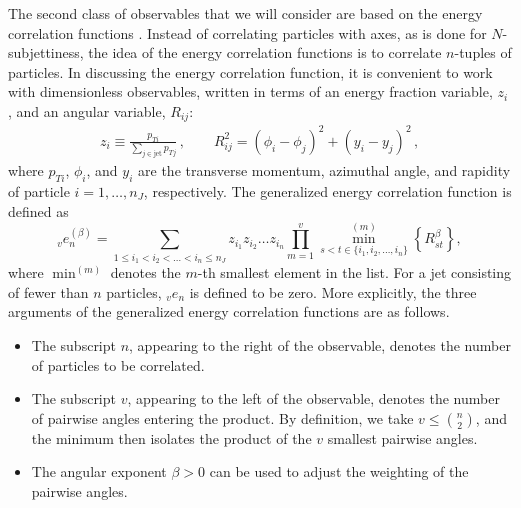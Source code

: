\documentclass[11pt,letterpaper]{article}
\DeclareRobustCommand{\Ref}[1]{Ref.~\cite{#1}}
\newcommand{\ecfvar}[3]{{_{#1}e_{#2}^{(#3)}}}
\newcommand{\ecfvarnobeta}[2]{{_{#1}e_{#2}}}
\begin{document}
The second class of observables that we will consider are based on the energy correlation functions \cite{Larkoski:2013eya,Moult:2016cvt}.
%
Instead of correlating particles with axes, as is done for $N$-subjettiness, the idea of the energy correlation functions is to correlate $n$-tuples of particles.
%
In discussing the energy correlation function, it is convenient to work with dimensionless observables, written in terms of an energy fraction variable, $z_i$, and an angular variable, $R_{ij}$:
\begin{align}\label{eq:ptratio}  
z_i\equiv\frac{p_{Ti}}{\sum_{j \in \text{jet}} p_{Tj}}\,, \qquad   R_{ij}^2 = (\phi_i-\phi_j)^2+(y_i-y_j)^2\,,
\end{align}
where $p_{Ti}$, $\phi_i$, and $y_i$ are the transverse momentum,
azimuthal angle, and rapidity of particle $i=1,\dots,n_J$, respectively. 
%
%
The generalized energy correlation function is defined as
\begin{equation}\label{eq:ecf_gen}
\ecfvar{v}{n}{\beta} = \sum_{1 \leq i_1 < i_2 < \dots < i_n \leq n_J} z_{i_1} z_{i_2} \dots z_{i_n} \prod_{m = 1}^{v} \min^{(m)}_{s < t \in \{i_1, i_2 , \dots, i_n \}} \left\{ R_{st}^{\beta} \right\},
\end{equation}
where $\min^{(m)}$ denotes the $m$-th smallest element in the list.  For a jet consisting of fewer than $n$ particles, $\ecfvarnobeta{v}{n}$ is defined to be zero.  More explicitly, the three arguments of the generalized energy correlation functions are as follows.
\begin{itemize}
\item The subscript $n$, appearing to the right of the observable, denotes the number of particles to be correlated.   
\item The subscript $v$, appearing to the left of the observable, denotes the number of pairwise angles entering the product.  By definition, we take $v \leq \binom{n}{2}$, and the minimum then isolates the product of the $v$ smallest pairwise angles.
\item The angular exponent $\beta>0$ can be used to adjust the weighting of the pairwise angles.
\end{itemize}
\end{document}
